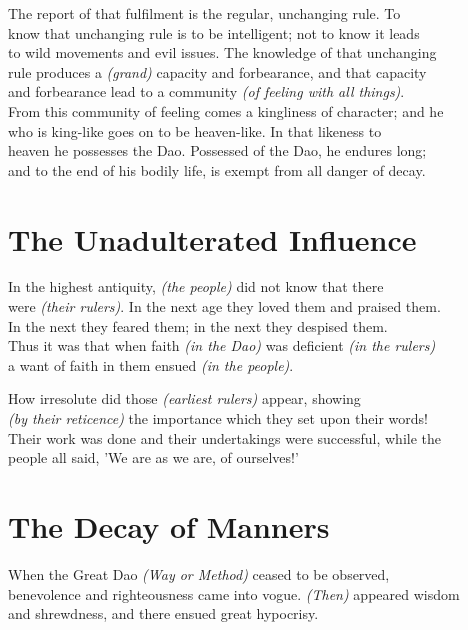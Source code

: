     The report of that fulfilment is the regular, unchanging rule. To\\
    know that unchanging rule is to be intelligent; not to know it leads\\
    to wild movements and evil issues. The knowledge of that unchanging\\
    rule produces a \textit{(grand)} capacity and forbearance, and that capacity\\
    and forbearance lead to a community \textit{(of feeling with all things)}.\\
    From this community of feeling comes a kingliness of character; and he\\
    who is king-like goes on to be heaven-like. In that likeness to\\
    heaven he possesses the Dao. Possessed of the Dao, he endures long;\\
    and to the end of his bodily life, is exempt from all danger of decay.\vspace{\baselineskip}
    
\section*{The Unadulterated Influence}
    In the highest antiquity, \textit{(the people)} did not know that there\\
    were \textit{(their rulers)}. In the next age they loved them and praised them.\\
    In the next they feared them; in the next they despised them.\\
    Thus it was that when faith \textit{(in the Dao)} was deficient \textit{(in the rulers)}\\
    a want of faith in them ensued \textit{(in the people)}.\newpage
    
    How irresolute did those \textit{(earliest rulers)} appear, showing\\
    \textit{(by their reticence)} the importance which they set upon their words!\\
    Their work was done and their undertakings were successful, while the\\
    people all said, 'We are as we are, of ourselves!'\vspace{\baselineskip}
    
\section*{The Decay of Manners}
    When the Great Dao \textit{(Way or Method)} ceased to be observed,\\
    benevolence and righteousness came into vogue. \textit{(Then)} appeared wisdom\\
    and shrewdness, and there ensued great hypocrisy.\vspace{\baselineskip}
    

